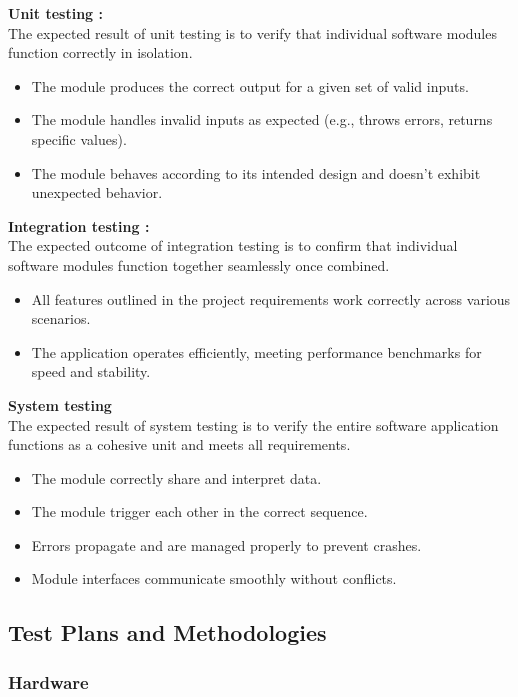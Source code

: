 \documentclass[a4paper,12pt]{article}
\begin{document}
		\textbf{Unit testing :}
		\\
		The expected result of unit testing is to verify that individual software modules function correctly in isolation.
		\begin{itemize}
			\item The module produces the correct output for a given set of valid inputs.
			\item The module handles invalid inputs as expected (e.g., throws errors, returns specific values).
			\item The module behaves according to its intended design and doesn't exhibit unexpected behavior.
		\end{itemize}
	\textbf{Integration testing :}
	\\
	The expected outcome of integration testing is to confirm that individual software modules function together seamlessly once combined.
	\begin{itemize}
		\item All features outlined in the project requirements work correctly across various scenarios.
		\item The application operates efficiently, meeting performance benchmarks for speed and stability.
		
	\end{itemize}

	\textbf{System testing}
\\
The expected result of system testing is to verify the entire software application functions as a cohesive unit and meets all requirements.

\begin{itemize}
	\item The module correctly share and interpret data.
	\item The module trigger each other in the correct sequence.
	\item Errors propagate and are managed properly to prevent crashes.
	\item Module interfaces communicate smoothly without conflicts.
	
\end{itemize}
		
	
	\subsection{Test Plans and Methodologies}
	\subsubsection{Hardware}
	
\end{document}
